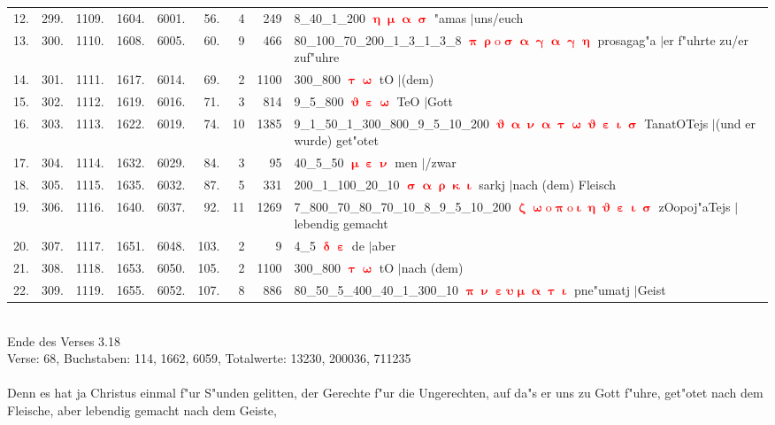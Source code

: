 \documentclass[a4paper,10pt,landscape]{article}
\begin{document}
\begin{tabular}{rrrrrrrrp{120mm}}
12.&299.&1109.&1604.&6001.&56.&4&249&8\_40\_1\_200 \textcolor{red}{$\boldsymbol{\upeta\upmu\upalpha\upsigma}$} "amas $|$uns/euch\\
13.&300.&1110.&1608.&6005.&60.&9&466&80\_100\_70\_200\_1\_3\_1\_3\_8 \textcolor{red}{$\boldsymbol{\uppi\uprho\mathrm{o}\upsigma\upalpha\upgamma\upalpha\upgamma\upeta}$} prosagag"a $|$er f"uhrte zu/er zuf"uhre\\
14.&301.&1111.&1617.&6014.&69.&2&1100&300\_800 \textcolor{red}{$\boldsymbol{\uptau\upomega}$} tO $|$(dem)\\
15.&302.&1112.&1619.&6016.&71.&3&814&9\_5\_800 \textcolor{red}{$\boldsymbol{\upvartheta\upepsilon\upomega}$} TeO $|$Gott\\
16.&303.&1113.&1622.&6019.&74.&10&1385&9\_1\_50\_1\_300\_800\_9\_5\_10\_200 \textcolor{red}{$\boldsymbol{\upvartheta\upalpha\upnu\upalpha\uptau\upomega\upvartheta\upepsilon\upiota\upsigma}$} TanatOTejs $|$(und er wurde) get"otet\\
17.&304.&1114.&1632.&6029.&84.&3&95&40\_5\_50 \textcolor{red}{$\boldsymbol{\upmu\upepsilon\upnu}$} men $|$/zwar\\
18.&305.&1115.&1635.&6032.&87.&5&331&200\_1\_100\_20\_10 \textcolor{red}{$\boldsymbol{\upsigma\upalpha\uprho\upkappa\upiota}$} sarkj $|$nach (dem) Fleisch\\
19.&306.&1116.&1640.&6037.&92.&11&1269&7\_800\_70\_80\_70\_10\_8\_9\_5\_10\_200 \textcolor{red}{$\boldsymbol{\upzeta\upomega\mathrm{o}\uppi\mathrm{o}\upiota\upeta\upvartheta\upepsilon\upiota\upsigma}$} zOopoj"aTejs $|$lebendig gemacht\\
20.&307.&1117.&1651.&6048.&103.&2&9&4\_5 \textcolor{red}{$\boldsymbol{\updelta\upepsilon}$} de $|$aber\\
21.&308.&1118.&1653.&6050.&105.&2&1100&300\_800 \textcolor{red}{$\boldsymbol{\uptau\upomega}$} tO $|$nach (dem)\\
22.&309.&1119.&1655.&6052.&107.&8&886&80\_50\_5\_400\_40\_1\_300\_10 \textcolor{red}{$\boldsymbol{\uppi\upnu\upepsilon\upsilon\upmu\upalpha\uptau\upiota}$} pne"umatj $|$Geist\\
\end{tabular}\medskip \\
Ende des Verses 3.18\\
Verse: 68, Buchstaben: 114, 1662, 6059, Totalwerte: 13230, 200036, 711235\\
\\
Denn es hat ja Christus einmal f"ur S"unden gelitten, der Gerechte f"ur die Ungerechten, auf da"s er uns zu Gott f"uhre, get"otet nach dem Fleische, aber lebendig gemacht nach dem Geiste,\\
\end{document}
